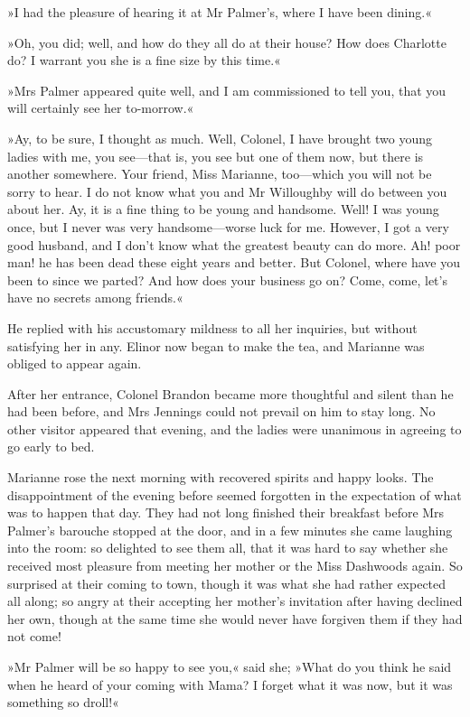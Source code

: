 »I had the pleasure of hearing it at Mr Palmer’s, where I have been dining.«

»Oh, you did; well, and how do they all do at their house? How does Charlotte do? I warrant you she is a fine size by this time.«

»Mrs Palmer appeared quite well, and I am commissioned to tell you, that you will certainly see her to-morrow.«

»Ay, to be sure, I thought as much. Well, Colonel, I have brought two young ladies with me, you see—that is, you see but one of them now, but there is another somewhere. Your friend, Miss Marianne, too—which you will not be sorry to hear. I do not know what you and Mr Willoughby will do between you about her. Ay, it is a fine thing to be young and handsome. Well! I was young once, but I never was very handsome—worse luck for me. However, I got a very good husband, and I don’t know what the greatest beauty can do more. Ah! poor man! he has been dead these eight years and better. But Colonel, where have you been to since we parted? And how does your business go on? Come, come, let’s have no secrets among friends.«

He replied with his accustomary mildness to all her inquiries, but without satisfying her in any. Elinor now began to make the tea, and Marianne was obliged to appear again.

After her entrance, Colonel Brandon became more thoughtful and silent than he had been before, and Mrs Jennings could not prevail on him to stay long. No other visitor appeared that evening, and the ladies were unanimous in agreeing to go early to bed.

Marianne rose the next morning with recovered spirits and happy looks. The disappointment of the evening before seemed forgotten in the expectation of what was to happen that day. They had not long finished their breakfast before Mrs Palmer’s barouche stopped at the door, and in a few minutes she came laughing into the room: so delighted to see them all, that it was hard to say whether she received most pleasure from meeting her mother or the Miss Dashwoods again. So surprised at their coming to town, though it was what she had rather expected all along; so angry at their accepting her mother’s invitation after having declined her own, though at the same time she would never have forgiven them if they had not come!

»Mr Palmer will be so happy to see you,« said she; »What do you think he said when he heard of your coming with Mama? I forget what it was now, but it was something so droll!«

